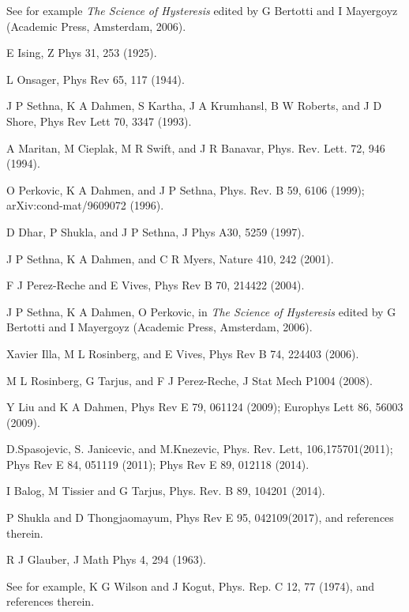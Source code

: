 \documentclass[a4,aps,amsmath,floatfix,nofootinbib,10pt]{revtex4}
\begin{document}
\begin{thebibliography}{99}

 See for example {\em{The Science of Hysteresis}} 
edited by G Bertotti and I Mayergoyz (Academic Press, Amsterdam, 2006).

 E Ising, Z Phys 31, 253 (1925).

 L Onsager, Phys Rev 65, 117 (1944).

 J P Sethna, K A Dahmen, S Kartha, J A Krumhansl, B W 
Roberts, and J D Shore, Phys Rev Lett 70, 3347 (1993).

A Maritan, M Cieplak, M R Swift, and J R Banavar, 
Phys. Rev. Lett. 72, 946 (1994).

 O Perkovic, K A Dahmen, and J P Sethna, Phys. Rev.
B 59, 6106 (1999); arXiv:cond-mat/9609072 (1996).

 D Dhar, P Shukla, and J P Sethna, J Phys A30, 5259 
(1997).

 J P Sethna, K A Dahmen, and C R Myers, Nature 410, 
242 (2001).

 F J Perez-Reche and E Vives, Phys Rev B 70, 214422 
(2004).

 J P Sethna, K A Dahmen, O Perkovic, in {\em{The 
Science of Hysteresis}} edited by G Bertotti and I Mayergoyz (Academic 
Press, Amsterdam, 2006).

 Xavier Illa, M L Rosinberg, and E Vives, Phys Rev B 74, 
224403 (2006).

 M L Rosinberg, G Tarjus, and F J Perez-Reche, J 
Stat Mech P1004 (2008).

 Y Liu and K A Dahmen, Phys Rev E 79, 061124 (2009);
Europhys Lett 86, 56003 (2009).

 D.Spasojevic, S. Janicevic, and M.Knezevic, Phys. 
Rev. Lett, 106,175701(2011); Phys Rev E 84, 051119 (2011); Phys Rev E 
89, 012118 (2014).

 I Balog, M Tissier and G Tarjus, Phys. Rev. B 89, 104201 
(2014).

 P Shukla and D Thongjaomayum, Phys Rev E 95, 
042109(2017), and references therein.

 R J Glauber, J Math Phys 4, 294 (1963).

 See for example, K G Wilson and J Kogut, Phys. Rep. 
C 12, 77 (1974), and references therein.


\end{thebibliography}
\end{document}
